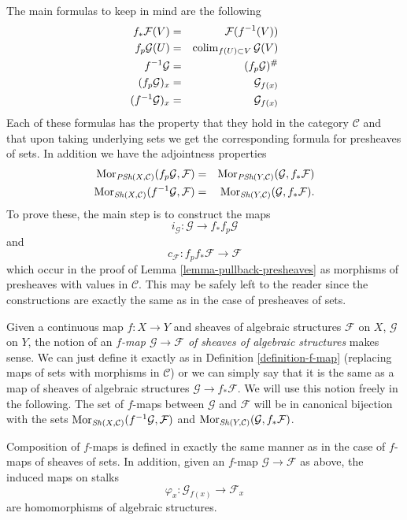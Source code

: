 \medskip\noindent
The main formulas to keep in mind are the following
\begin{eqnarray*}
f_*\mathcal{F}(V) & = & \mathcal{F}(f^{-1}(V)) \\
f_p\mathcal{G}(U) & = & \mathop{\mathrm{colim}}\nolimits_{f(U) \subset V} \mathcal{G}(V) \\
f^{-1}\mathcal{G} & = & (f_p\mathcal{G})^\# \\
(f_p\mathcal{G})_x & = & \mathcal{G}_{f(x)} \\
(f^{-1}\mathcal{G})_x & = & \mathcal{G}_{f(x)}
\end{eqnarray*}
Each of these formulas has the property that they hold in the
category $\mathcal{C}$ and that upon taking underlying
sets we get the corresponding formula for presheaves of sets.
In addition we have the adjointness properties
\begin{eqnarray*}
\mathop{\mathrm{Mor}}\nolimits_{\textit{PSh}(X, \mathcal{C})}(f_p\mathcal{G}, \mathcal{F})
& = &
\mathop{\mathrm{Mor}}\nolimits_{\textit{PSh}(Y, \mathcal{C})}(\mathcal{G}, f_*\mathcal{F}) \\
\mathop{\mathrm{Mor}}\nolimits_{\mathop{\mathit{Sh}}\nolimits(X, \mathcal{C})}(f^{-1}\mathcal{G}, \mathcal{F})
& = &
\mathop{\mathrm{Mor}}\nolimits_{\mathop{\mathit{Sh}}\nolimits(Y, \mathcal{C})}(\mathcal{G}, f_*\mathcal{F}).
\end{eqnarray*}
To prove these, the main step is to construct the maps
$$
i_\mathcal{G} : \mathcal{G} \longrightarrow f_*f_p\mathcal{G}
$$
and
$$
c_\mathcal{F} : f_p f_* \mathcal{F} \longrightarrow \mathcal{F}
$$
which occur in the proof of Lemma \ref{lemma-pullback-presheaves} as
morphisms of presheaves with values in $\mathcal{C}$. This may be safely
left to the reader since the constructions are exactly the same
as in the case of presheaves of sets.

\medskip\noindent
Given a continuous map $f : X \to Y$ and sheaves of algebraic
structures $\mathcal{F}$ on $X$, $\mathcal{G}$ on $Y$, the notion
of an {\it $f$-map $\mathcal{G} \to \mathcal{F}$
of sheaves of algebraic structures} makes sense. We can just define
it exactly as in Definition \ref{definition-f-map} (replacing maps
of sets with morphisms in $\mathcal{C}$) or we can
simply say that it is the same as a map of sheaves of algebraic
structures $\mathcal{G} \to f_*\mathcal{F}$. We will use this
notion freely in the following. The set of $f$-maps between
$\mathcal{G}$ and $\mathcal{F}$ will be in canonical bijection
with the sets
$\mathop{\mathrm{Mor}}\nolimits_{\mathop{\mathit{Sh}}\nolimits(X, \mathcal{C})}(f^{-1}\mathcal{G}, \mathcal{F})$
and
$\mathop{\mathrm{Mor}}\nolimits_{\mathop{\mathit{Sh}}\nolimits(Y, \mathcal{C})}(\mathcal{G}, f_*\mathcal{F})$.

\medskip\noindent
Composition of $f$-maps is defined in exactly the
same manner as in the case of $f$-maps of sheaves of
sets. In addition, given an $f$-map $\mathcal{G} \to \mathcal{F}$
as above, the induced maps on stalks
$$
\varphi_x : \mathcal{G}_{f(x)} \longrightarrow \mathcal{F}_x
$$
are homomorphisms of algebraic structures.



